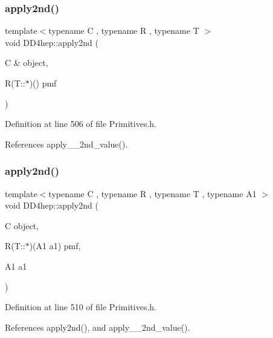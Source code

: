 \hypertarget{namespace_d_d4hep_a2e08c4f02331450925ff16a4fd902f6e}{}\label{namespace_d_d4hep_a2e08c4f02331450925ff16a4fd902f6e} 
\subsubsection{\texorpdfstring{apply2nd()}{apply2nd()}\hspace{0.1cm}{\footnotesize\ttfamily [2/3]}}
{\footnotesize\ttfamily template$<$typename C , typename R , typename T $>$ \\
void D\+D4hep\+::apply2nd (\begin{DoxyParamCaption}\item[{C \&}]{object,  }\item[{R(T\+::$\ast$)()}]{pmf }\end{DoxyParamCaption})}



Definition at line 506 of file Primitives.\+h.



References apply\+\_\+\+\_\+2nd\+\_\+value().

\hypertarget{namespace_d_d4hep_ad8ba7e02c7d191ebeefb36f2a9278bbb}{}\label{namespace_d_d4hep_ad8ba7e02c7d191ebeefb36f2a9278bbb} 
\subsubsection{\texorpdfstring{apply2nd()}{apply2nd()}\hspace{0.1cm}{\footnotesize\ttfamily [3/3]}}
{\footnotesize\ttfamily template$<$typename C , typename R , typename T , typename A1 $>$ \\
void D\+D4hep\+::apply2nd (\begin{DoxyParamCaption}\item[{C}]{object,  }\item[{R(T\+::$\ast$)(A1 a1)}]{pmf,  }\item[{A1}]{a1 }\end{DoxyParamCaption})}



Definition at line 510 of file Primitives.\+h.



References apply2nd(), and apply\+\_\+\+\_\+2nd\+\_\+value().

\hypertarget{namespace_d_d4hep_a75dc945aea0045c5f5c9ce4315b77d3b}{}\label{namespace_d_d4hep_a75dc945aea0045c5f5c9ce4315b77d3b} 
